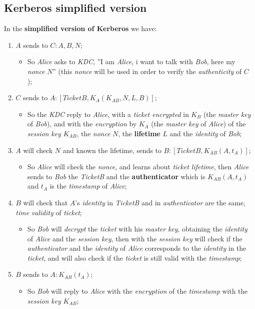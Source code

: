 \documentclass{article}
\begin{document}
\subsection{Kerberos simplified version}
In the \textbf{simplified version of Kerberos }we have:
\begin{enumerate}
\item $A$ sends to $C: A, B, N$;
\begin{itemize}
\item So \emph{Alice} asks to \emph{KDC}, ''I am \emph{Alice}, i want to talk with \emph{Bob}, here my \emph{nonce} $N$'' (this \emph{nonce} will be used in order to verify the \emph{authenticity} of $C$);
\end{itemize}
\item $C$ sends to $A: \left [ TicketB, K_{A}(K_{AB},N,L,B) \right ]$;
\begin{itemize}
\item So the \emph{KDC} reply to \emph{Alice}, with a \emph{ticket encrypted} in $K_B$ (the \emph{master key} of \emph{Bob}), and with the \emph{encryption} by $K_A$ (the \emph{master key} of \emph{Alice}) of the \emph{session key} $K_{AB}$, the \emph{nonce} $N$, the \textbf{lifetime} $L$ and the \emph{identity} of \emph{Bob};
\end{itemize}
\item $A$ will check $N$ and known the lifetime, sends to $B : \left [TicketB, K_{AB}(A,t_A) \right ]$;
\begin{itemize}
\item So \emph{Alice} will check the \emph{nonce}, and learns about \emph{ticket lifetime}, then \emph{Alice} sends to \emph{Bob} the \emph{TicketB} and the \textbf{authenticator} which is $K_{AB}(A,t_A)$ and $t_A$ is the \emph{timestamp} of \emph{Alice};
\end{itemize}
\clearpage
\item $B$ will check that $A$'s \emph{identity} in \emph{TicketB} and in \emph{authenticator} are the same, \emph{time validity} of \emph{ticket};
\begin{itemize}
\item So \emph{Bob} will \emph{decrypt} the \emph{ticket} with his \emph{master key}, obtaining the \emph{identity} of \emph{Alice} and the \emph{session key}, then with the \emph{session key} will check if the \emph{authenticator} and the \emph{identity} of \emph{Alice} corresponds to the \emph{identity} in the \emph{ticket}, and will also check if the \emph{ticket} is still valid with the \emph{timestamp};
\end{itemize}
\item $B$ sends to $A: K_{AB}(t_A)$;
\begin{itemize}
\item So \emph{Bob} will reply to \emph{Alice} with the \emph{encryption} of the \emph{timestamp} with the \emph{session key} $K_{AB}$;
\end{itemize}
\end{enumerate}
\end{document}
